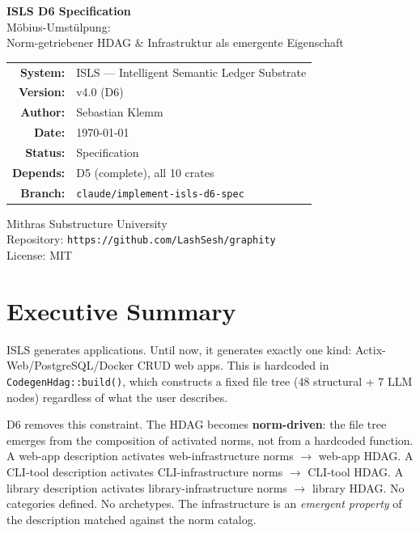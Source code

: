 \documentclass[11pt,a4paper]{article}
\begin{document}
\begin{titlepage}
\centering
\vspace*{2.5cm}

{\Huge\bfseries\color{isls-blue} ISLS D6 Specification}\\[0.5cm]
{\LARGE\color{isls-orange} M\"obius-Umst\"ulpung:\\Norm-getriebener HDAG \& Infrastruktur als emergente Eigenschaft}\\[2cm]

{\large
\begin{tabular}{rl}
\textbf{System:}    & ISLS --- Intelligent Semantic Ledger Substrate \\
\textbf{Version:}   & v4.0 (D6) \\
\textbf{Author:}    & Sebastian Klemm \\
\textbf{Date:}      & \today \\
\textbf{Status:}    & Specification \\
\textbf{Depends:}   & D5 (complete), all 10 crates \\
\textbf{Branch:}    & \texttt{claude/implement-isls-d6-spec} \\
\end{tabular}
}

\vfill

{\small\color{isls-gray}
Mithras Substructure University\\
Repository: \texttt{https://github.com/LashSesh/graphity}\\
License: MIT
}
\end{titlepage}

\tableofcontents
\newpage


\section{Executive Summary}

ISLS generates applications. Until now, it generates exactly one kind: 
Actix-Web/PostgreSQL/Docker CRUD web apps. This is hardcoded in 
\texttt{CodegenHdag::build()}, which constructs a fixed file tree
(48 structural + 7 LLM nodes) regardless of what the user describes.

D6 removes this constraint. The HDAG becomes \textbf{norm-driven}: 
the file tree emerges from the composition of activated norms, not
from a hardcoded function. A web-app description activates 
web-infrastructure norms $\to$ web-app HDAG. A CLI-tool description
activates CLI-infrastructure norms $\to$ CLI-tool HDAG. A library
description activates library-infrastructure norms $\to$ library HDAG.
No categories defined. No archetypes. The infrastructure is an
\emph{emergent property} of the description matched against the norm 
catalog.
\end{document}
